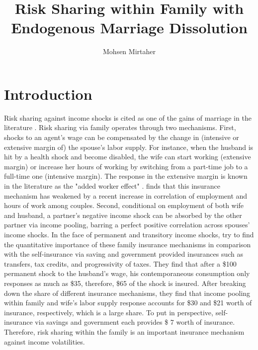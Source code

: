 
\doublespacing


\title{Risk Sharing within Family with Endogenous Marriage Dissolution}
\author{Mohsen Mirtaher}
\date{}
\maketitle

\section{Introduction}



Risk sharing against income shocks is cited as one of the gains of marriage in the literature \citep{Chiappori_Mazzocco_2014}. Risk sharing via family operates through two mechanisms. First, shocks to an agent's wage can be compensated by the change in (intensive or extensive margin of) the spouse's labor supply. For instance, when the husband is hit by a health shock and become disabled, the wife can start working (extensive margin) or increase her hours of working by switching from a part-time job to a full-time one (intensive margin). The response in the extensive margin is known in the literature as the "added worker effect" \citep{Hyslop_2001}. \citet{Juhn_Potter_2007} finds that this insurance mechanism has weakened by a recent increase in correlation of employment and hours of work among couples. Second, conditional on employment of both wife and husband, a partner's negative income shock can be absorbed by the other partner via income pooling, barring a perfect positive correlation across spouses' income shocks. In the face of permanent and transitory income shocks, \citet{Blundell_etal_2015_Con-Ineq} try to find the quantitative importance of these family insurance mechanisms in comparison with the self-insurance via saving and government provided insurances such as transfers, tax credits, and progressivity of taxes. They find that after a \$100 permanent shock to the husband's wage, his contemporaneous consumption only responses as much as \$35, therefore, \$65 of the shock is insured. After breaking down the share of different insurance mechanisms, they find that income pooling within family and wife's labor supply response accounts for \$30 and \$21 worth of insurance, respectively, which is a large share. To put in perspective, self-insurance via savings and government each provides \$ 7 worth of insurance. Therefore, risk sharing within the family is an important insurance mechanism against income volatilities. \\ 

